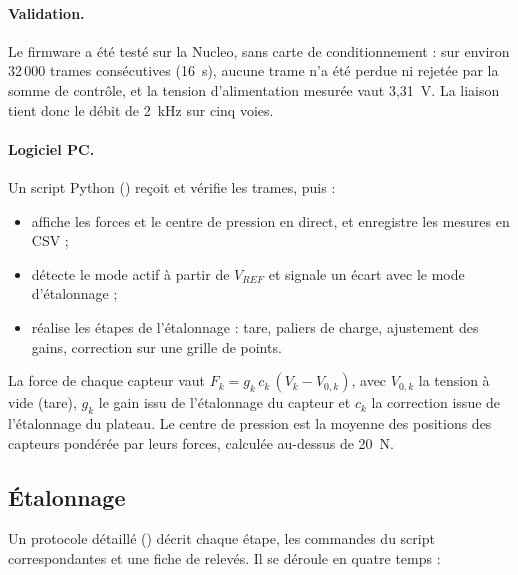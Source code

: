 \paragraph{Validation.} Le firmware a été testé sur la Nucleo, sans carte de conditionnement : sur environ 32\,000 trames consécutives (16~s), aucune trame n'a été perdue ni rejetée par la somme de contrôle, et la tension d'alimentation mesurée vaut 3,31~V. La liaison tient donc le débit de 2~kHz sur cinq voies.

\paragraph{Logiciel PC.} Un script Python () reçoit et vérifie les trames, puis :
\begin{itemize}
  \item affiche les forces et le centre de pression en direct, et enregistre les mesures en CSV ;
  \item détecte le mode actif à partir de $V_{REF}$ et signale un écart avec le mode d'étalonnage ;
  \item réalise les étapes de l'étalonnage : tare, paliers de charge, ajustement des gains, correction sur une grille de points.
\end{itemize}
La force de chaque capteur vaut $F_k = g_k\,c_k\,(V_k - V_{0,k})$, avec $V_{0,k}$ la tension à vide (tare), $g_k$ le gain issu de l'étalonnage du capteur et $c_k$ la correction issue de l'étalonnage du plateau. Le centre de pression est la moyenne des positions des capteurs pondérée par leurs forces, calculée au-dessus de 20~N.

\subsection{Étalonnage}

Un protocole détaillé () décrit chaque étape, les commandes du script correspondantes et une fiche de relevés. Il se déroule en quatre temps :

